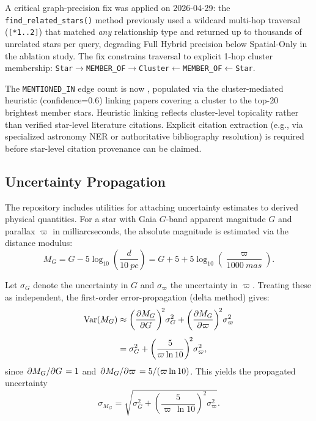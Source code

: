 \documentclass[12pt]{elsarticle}
\newcommand{\parallax}{\varpi}
\begin{document}
A critical graph-precision fix was applied on 2026-04-29: the \texttt{find\_related\_stars()} method previously used a wildcard multi-hop traversal (\texttt{[*1..2]}) that matched \emph{any} relationship type and returned up to thousands of unrelated stars per query, degrading Full Hybrid precision below Spatial-Only in the ablation study. The fix constrains traversal to explicit 1-hop cluster membership: \texttt{Star}${\to}$\texttt{MEMBER\allowbreak\_OF}${\to}$\texttt{Cluster}${\leftarrow}$\texttt{MEMBER\allowbreak\_OF}${\leftarrow}$\texttt{Star}.

The \texttt{MENTIONED\_IN} edge count is now \textbf{\nMentionedInEdges{}}, populated via the cluster-mediated heuristic (confidence=0.6) linking papers covering a cluster to the top-20 brightest member stars. Heuristic linking reflects cluster-level topicality rather than verified star-level literature citations. Explicit citation extraction (e.g., via specialized astronomy NER or authoritative bibliography resolution) is required before star-level citation provenance can be claimed.

\subsection{Uncertainty Propagation}
\label{sec:uncertainty}

The repository includes utilities for attaching uncertainty estimates to derived physical quantities. For a star with Gaia $G$-band apparent magnitude $G$ and parallax $\parallax$ in milliarcseconds, the absolute magnitude is estimated via the distance modulus:
\begin{equation}
M_G = G - 5\log_{10}\!\left(\frac{d}{\SI{10}{pc}}\right)
     = G + 5 + 5\log_{10}\!\left(\frac{\parallax}{\SI{1000}{mas}}\right).
\label{eq:mg}
\end{equation}

Let $\sigma_G$ denote the uncertainty in $G$ and $\sigma_\parallax$ the uncertainty in $\parallax$. Treating these as independent, the first-order error-propagation (delta method) gives:
\begin{align}
\operatorname{Var}(M_G)
 &\approx \left(\pdv{M_G}{G}\right)^{\!2}\!\sigma_G^{2}
   + \left(\pdv{M_G}{\parallax}\right)^{\!2}\!\sigma_{\parallax}^{2} \label{eq:delta_method} \\[4pt]
 &= \sigma_G^{2}
   + \left(\frac{5}{\parallax \ln 10}\right)^{\!2}\!\sigma_{\parallax}^{2},
\end{align}
since $\pdv*{M_G}{G}=1$ and $\pdv*{M_G}{\parallax}=5/(\parallax\ln 10)$. This yields the propagated uncertainty
\begin{equation}
\sigma_{M_G} = \sqrt{\sigma_G^{2}
      + \left(\frac{5}{\parallax\,\ln 10}\right)^{\!2}\sigma_{\parallax}^{2}} .
\label{eq:mgerr}
\end{equation}
\end{document}
